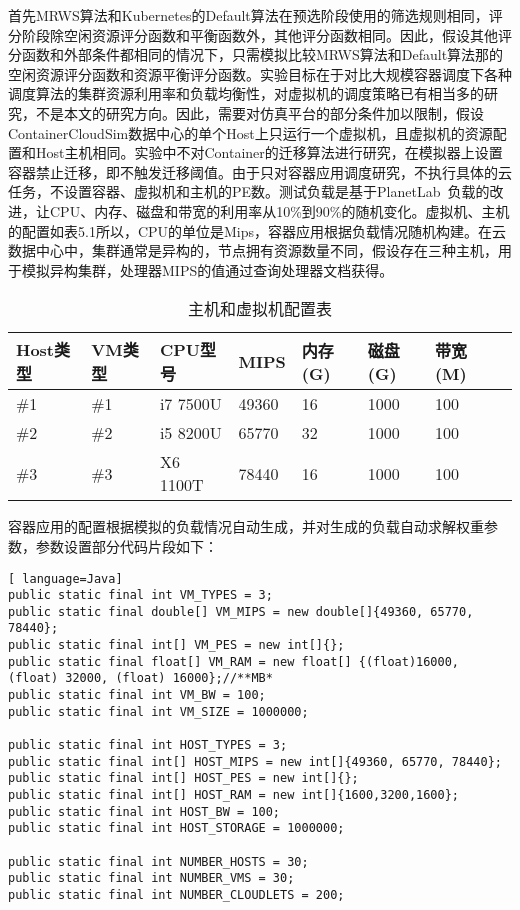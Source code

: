 首先MRWS算法和Kubernetes的Default算法在预选阶段使用的筛选规则相同，评分阶段除空闲资源评分函数和平衡函数外，其他评分函数相同。因此，假设其他评分函数和外部条件都相同的情况下，只需模拟比较MRWS算法和Default算法那的空闲资源评分函数和资源平衡评分函数。实验目标在于对比大规模容器调度下各种调度算法的集群资源利用率和负载均衡性，对虚拟机的调度策略已有相当多的研究，不是本文的研究方向。因此，需要对仿真平台的部分条件加以限制，假设ContainerCloudSim数据中心的单个Host上只运行一个虚拟机，且虚拟机的资源配置和Host主机相同。实验中不对Container的迁移算法进行研究，在模拟器上设置容器禁止迁移，即不触发迁移阈值。由于只对容器应用调度研究，不执行具体的云任务，不设置容器、虚拟机和主机的PE数。测试负载是基于PlanetLab~\cite{Park2006CoMon}负载的改进，让CPU、内存、磁盘和带宽的利用率从10\%到90\%的随机变化。虚拟机、主机的配置如表5.1所以，CPU的单位是Mips，容器应用根据负载情况随机构建。在云数据中心中，集群通常是异构的，节点拥有资源数量不同，假设存在三种主机，用于模拟异构集群，处理器MIPS的值通过查询处理器文档获得。
\begin{table}[H]
	\centering\dawu[1.3]
	\caption{主机和虚拟机配置表}
	\begin{tabular}{|p{1.8cm}<{\centering}|p{1.5cm}<{\centering}|p{2cm}<{\centering}|p{1.5cm}<{\centering}|p{1.5cm}<{\centering}|p{1.5cm}<{\centering}|p{1.5cm}<{\centering}|p{1.5cm}<{\centering}|} \hline
		Host类型 & VM类型 & CPU型号 & MIPS & 内存(G) & 磁盘(G) & 带宽(M) \\ \hline
		\#1 & \#1 & i7 7500U & 49360 & 16 & 1000  & 100 \\ \hline
		\#2 & \#2 & i5 8200U & 65770 & 32 & 1000 & 100 \\ \hline
		\#3 & \#3 & X6 1100T & 78440 & 16 & 1000 & 100 \\ \hline
	\end{tabular}
\end{table}

容器应用的配置根据模拟的负载情况自动生成，并对生成的负载自动求解权重参数，参数设置部分代码片段如下：
\begin{lstlisting}[ language=Java]
public static final int VM_TYPES = 3;
public static final double[] VM_MIPS = new double[]{49360, 65770, 78440};
public static final int[] VM_PES = new int[]{};
public static final float[] VM_RAM = new float[] {(float)16000, (float) 32000, (float) 16000};//**MB*
public static final int VM_BW = 100;
public static final int VM_SIZE = 1000000;

public static final int HOST_TYPES = 3;
public static final int[] HOST_MIPS = new int[]{49360, 65770, 78440};
public static final int[] HOST_PES = new int[]{};
public static final int[] HOST_RAM = new int[]{1600,3200,1600};
public static final int HOST_BW = 100;
public static final int HOST_STORAGE = 1000000;

public static final int NUMBER_HOSTS = 30;
public static final int NUMBER_VMS = 30;
public static final int NUMBER_CLOUDLETS = 200;
\end{lstlisting}

